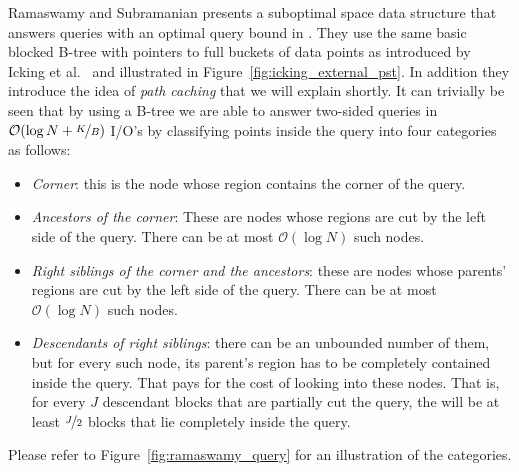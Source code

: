 \documentclass[twoside,11pt,openright]{report}
\begin{document}
Ramaswamy and Subramanian presents a suboptimal space data structure that answers queries with an optimal query bound in \cite{Ramaswamy:1994:PCT:182591.182595}. They use the same basic blocked B-tree with pointers to full buckets of data points as introduced by Icking et al.~\cite{Icking1988} and illustrated in Figure~\ref{fig:icking_external_pst}. In addition they introduce the idea of \textit{path caching} that we will explain shortly. It can trivially be seen that by using a B-tree we are able to answer two-sided queries in $\mathcal{O}(\log N + \nicefrac{K}{B})$ I/O's by classifying points inside the query into four categories as follows:

\begin{itemize}
	\item \textit{Corner}: this is the node whose region contains the corner of the query.
	\item \textit{Ancestors of the corner}: These are nodes whose regions are cut by the left side of the query. There can be at most $\mathcal{O}(\log N)$ such nodes.
	\item \textit{Right siblings of the corner and the ancestors}: these are nodes whose parents' regions are cut by the left side of the query. There can be at most $ \mathcal{O}(\log N)$ such nodes.
	\item \textit{Descendants of right siblings}: there can be an unbounded number of them, but for every such node, its parent's region has to be completely contained inside the query. That pays for the cost of looking into these nodes. That is, for every $J$ descendant blocks that are partially cut the query, the will be at least $\nicefrac{J}{2}$ blocks that lie completely inside the query. 

\end{itemize} 

Please refer to Figure~\ref{fig:ramaswamy_query} for an illustration of the categories.
\end{document}
